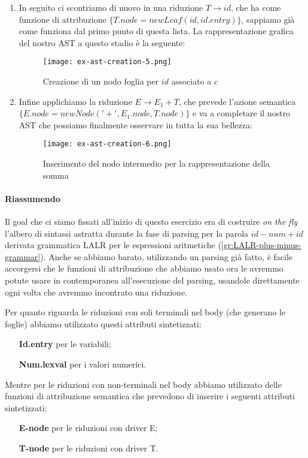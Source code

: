 \documentclass[class=book, crop=false, oneside, 12pt]{standalone}
\begin{document}
\begin{enumerate}
\begin{figure}[H]
    \end{figure} 
    \item In seguito ci scontriamo di nuovo in una riduzione \(T \to id\), che ha come funzione di attribuzione \(\{T.node = newLeaf(id, id.entry)\}\), sappiamo già come funziona dal primo punto di questa lista. La rappresentazione grafica del nostro AST a questo stadio è la seguente:
    \begin{figure}[H]
        \centering
        \texttt{[image: ex-ast-creation-5.png]}
        \caption{Creazione di un nodo foglia per \(id\) associato a \(c\)}
    \end{figure} 
    \item Infine applichiamo la riduzione \(E \to E_1 + T\), che prevede l'azione semantica \(\{E.node = newNode ('+', E_1.node, T.node)\}\) e va a completare il nostro AST che possiamo finalmente osservare in tutta la sua bellezza:
    \begin{figure}[H]
        \centering
        \texttt{[image: ex-ast-creation-6.png]}
        \caption{Inserimento del nodo intermedio per la rappresentazione della somma}
    \end{figure} 
\end{enumerate}

\paragraph{Riassumendo} Il goal che ci siamo fissati all'inizio di questo esercizio era di costruire \emph{on the fly} l'albero di sintassi astratta durante la fase di parsing per la parola \(id-num+id\) derivata grammatica LALR per le espressioni aritmetiche (\ref{gr:LALR-plus-minus-grammar}).
Anche se abbiamo barato, utilizzando un parsing già fatto, è facile accorgersi che le funzioni di attribuzione che abbiamo usato ora le avremmo potute usare in contemporanea all'esecuzione del parsing, usandole direttamente ogni volta che avremmo incontrato una riduzione.

\noindent Per quanto riguarda le riduzioni con soli terminali nel body (che generano le foglie) abbiamo utilizzato questi attributi sintetizzati:
\begin{itemize}
    \item[\textbf{Id.entry}] per le variabili;
    \item[\textbf{Num.lexval}] per i valori numerici.
\end{itemize}
Mentre per le riduzioni con non-terminali nel body abbiamo utilizzato delle funzioni di attribuzione semantica che prevedono di inserire i seguenti attributi sintetizzati:
\begin{itemize}
    \item[\textbf{E-node}] per le riduzioni con driver E;
    \item[\textbf{T-node}] per le riduzioni con driver T.
\end{itemize}
\end{document}
